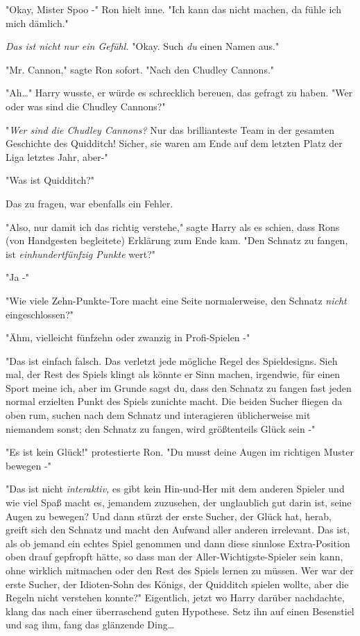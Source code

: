 {"Okay, Mister Spoo -" Ron hielt inne. "Ich kann das nicht machen, da fühle ich mich dämlich."

\emph{Das ist nicht nur ein Gefühl.} "Okay. Such \emph{du} einen Namen aus."

"Mr. Cannon," sagte Ron sofort. "Nach den Chudley Cannons."

"Ah…" Harry wusste, er würde es schrecklich bereuen, das gefragt zu haben. "Wer oder was sind die Chudley Cannons?"

"\emph{Wer sind die Chudley Cannons?} Nur das brillianteste Team in der gesamten Geschichte des Quidditch! Sicher, sie waren am Ende auf dem letzten Platz der Liga letztes Jahr, aber-"

"Was ist Quidditch?"

Das zu fragen, war ebenfalls ein Fehler.

"Also, nur damit ich das richtig verstehe," sagte Harry als es schien, dass Rons (von Handgesten begleitete) Erklärung zum Ende kam. "Den Schnatz zu fangen, ist \emph{einhundertfünfzig Punkte} wert?"

"Ja -"

"Wie viele Zehn-Punkte-Tore macht eine Seite normalerweise, den Schnatz \emph{nicht} eingeschlossen?"

"Ähm, vielleicht fünfzehn oder zwanzig in Profi-Spielen -"

"Das ist einfach falsch. Das verletzt jede mögliche Regel des Spieldesigns. Sieh mal, der Rest des Spiels klingt als könnte er Sinn machen, irgendwie, für einen Sport meine ich, aber im Grunde sagst du, dass den Schnatz zu fangen fast jeden normal erzielten Punkt des Spiels zunichte macht. Die beiden Sucher fliegen da oben rum, suchen nach dem Schnatz und interagieren üblicherweise mit niemandem sonst; den Schnatz zu fangen, wird größtenteils Glück sein -"

"Es ist kein Glück!" protestierte Ron. "Du musst deine Augen im richtigen Muster bewegen -"

"Das ist nicht \emph{interaktiv,} es gibt kein Hin-und-Her mit dem anderen Spieler und wie viel Spaß macht es, jemandem zuzusehen, der unglaublich gut darin ist, seine Augen zu bewegen? Und dann stürzt der erste Sucher, der Glück hat, herab, greift sich den Schnatz und macht den Aufwand aller anderen irrelevant. Das ist, als ob jemand ein echtes Spiel genommen und dann diese sinnlose Extra-Position oben drauf gepfropft hätte, so dass man der Aller-Wichtigste-Spieler sein kann, ohne wirklich mitmachen oder den Rest des Spiels lernen zu müssen. Wer war der erste Sucher, der Idioten-Sohn des Königs, der Quidditch spielen wollte, aber die Regeln nicht verstehen konnte?" Eigentlich, jetzt wo Harry darüber nachdachte, klang das nach einer überraschend guten Hypothese. Setz ihn auf einen Besenstiel und sag ihm, fang das glänzende Ding…

}
